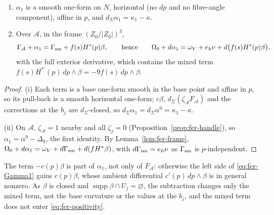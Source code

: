 \begin{lemma}\label{lem:fer-alpha1}
\begin{enumerate}[label=(\roman*)]
\item $\alpha_1$ is a smooth one-form on $N$, horizontal (no $dp$ and no fibre-angle component), affine in $p$, and
$d_\Sigma\alpha_1=\kappa_1-\kappa$.
\item Over $\mathcal A$, in the frame $(Z_0/|Z_0|)^3$,
\begin{equation}\label{eq:fer-Gamma1}
 \Gamma_{\mathcal A}+\alpha_1=\Gamma_{\rm sm}+f(s)H^*(p)\beta,\qquad\text{hence}\qquad
 \Omega_0+d\alpha_1=\omega_V+e_h\nu+d\big(f(s)H^*(p)\beta\big),
\end{equation}
with the full exterior derivative, which contains the mixed term $f(s)H^{*\prime}(p)\,dp\wedge\beta=-9f(s)\,dp\wedge\beta$.
\end{enumerate}
\end{lemma}

\begin{proof}
(i) Each term is a base one-form smooth in the base point and affine in $p$, so its pull-back is a smooth horizontal one-form; $c\beta$, $d_\Sigma(\zeta_{\mathcal A}F_{\mathcal A})$ and the corrections at the $b_j$ are $d_\Sigma$-closed, so $d_\Sigma\alpha_1=d_\Sigma\alpha^0=\kappa_1-\kappa$.

(ii) On $\mathcal A$, $\zeta_{\mathcal A}=1$ nearby and all $\zeta_j=0$ (Proposition~\ref{prop:fer-handle}), so $\alpha_1=\alpha^0-\Delta_0$, the first identity. By Lemma~\ref{lem:fer-frame}, $\Omega_0+d\alpha_1=\omega_V+d\Gamma_{\rm sm}+d(fH^*\beta)$, with $d\Gamma_{\rm sm}=e_h\nu$ as $\Gamma_{\rm sm}$ is $p$-independent.
\end{proof}

\begin{remark}\label{rem:fer-period}
The term $-c(p)\beta$ is part of $\alpha_1$, not only of $F_{\mathcal A}$: otherwise the left side of \eqref{eq:fer-Gamma1} gains
$c(p)\beta$, whose ambient differential $c'(p)\,dp\wedge\beta$ is in general nonzero. As $\beta$ is closed and
$\operatorname{supp}\beta\cap U_j=\varnothing$, the subtraction changes only the mixed term, not the base curvature or the values
at the $b_j$, and the mixed term does not enter \eqref{eq:fer-positivity}.
\end{remark}

